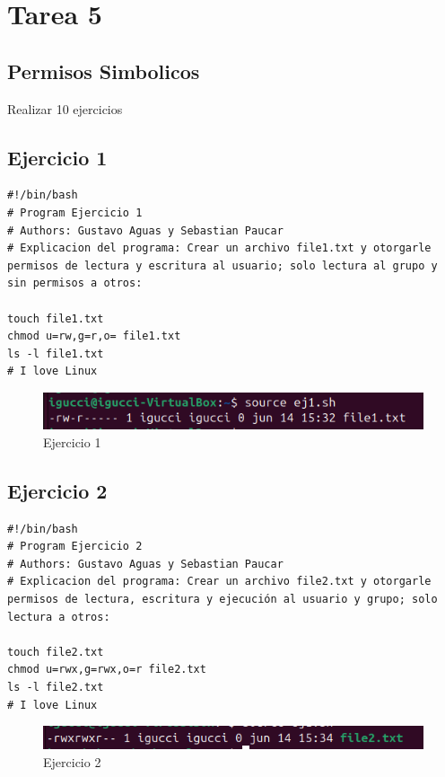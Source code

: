 \documentclass[11pt,twoside]{book}
\begin{document}
\section{Tarea 5}
\subsection{Permisos Simbolicos}
Realizar 10 ejercicios
\subsection{Ejercicio 1}
\begin{lstlisting}
#!/bin/bash
# Program Ejercicio 1
# Authors: Gustavo Aguas y Sebastian Paucar
# Explicacion del programa: Crear un archivo file1.txt y otorgarle permisos de lectura y escritura al usuario; solo lectura al grupo y sin permisos a otros:

touch file1.txt
chmod u=rw,g=r,o= file1.txt
ls -l file1.txt
# I love Linux
\end{lstlisting}
\begin{figure}[h]
    \centering
    \includegraphics[width=1\linewidth]{psimb/ej1.png}
    \caption{Ejercicio 1}
\end{figure}


\subsection{Ejercicio 2}
\begin{lstlisting}
#!/bin/bash
# Program Ejercicio 2
# Authors: Gustavo Aguas y Sebastian Paucar
# Explicacion del programa: Crear un archivo file2.txt y otorgarle permisos de lectura, escritura y ejecución al usuario y grupo; solo lectura a otros:

touch file2.txt
chmod u=rwx,g=rwx,o=r file2.txt
ls -l file2.txt
# I love Linux
\end{lstlisting}
\begin{figure}[h]
    \centering
    \includegraphics[width=1\linewidth]{psimb/ej2.png}
    \caption{Ejercicio 2}
\end{figure}
\end{document}
